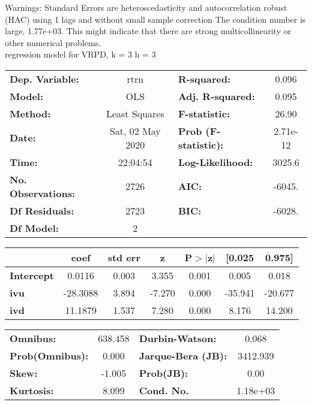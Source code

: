 Warnings: \newline
 [1] Standard Errors are heteroscedasticity and autocorrelation robust (HAC) using 1 lags and without small sample correction \newline
 [2] The condition number is large, 1.77e+03. This might indicate that there are \newline
 strong multicollinearity or other numerical problems.\\ 

regression model for VRPD, k = 3 h = 3\begin{center}
\begin{tabular}{lclc}
\toprule
\textbf{Dep. Variable:}    &       rtrn       & \textbf{  R-squared:         } &     0.096   \\
\textbf{Model:}            &       OLS        & \textbf{  Adj. R-squared:    } &     0.095   \\
\textbf{Method:}           &  Least Squares   & \textbf{  F-statistic:       } &     26.90   \\
\textbf{Date:}             & Sat, 02 May 2020 & \textbf{  Prob (F-statistic):} &  2.71e-12   \\
\textbf{Time:}             &     22:04:54     & \textbf{  Log-Likelihood:    } &    3025.6   \\
\textbf{No. Observations:} &        2726      & \textbf{  AIC:               } &    -6045.   \\
\textbf{Df Residuals:}     &        2723      & \textbf{  BIC:               } &    -6028.   \\
\textbf{Df Model:}         &           2      & \textbf{                     } &             \\
\bottomrule
\end{tabular}
\begin{tabular}{lcccccc}
                   & \textbf{coef} & \textbf{std err} & \textbf{z} & \textbf{P$> |$z$|$} & \textbf{[0.025} & \textbf{0.975]}  \\
\midrule
\textbf{Intercept} &       0.0116  &        0.003     &     3.355  &         0.001        &        0.005    &        0.018     \\
\textbf{ivu}       &     -28.3088  &        3.894     &    -7.270  &         0.000        &      -35.941    &      -20.677     \\
\textbf{ivd}       &      11.1879  &        1.537     &     7.280  &         0.000        &        8.176    &       14.200     \\
\bottomrule
\end{tabular}
\begin{tabular}{lclc}
\textbf{Omnibus:}       & 638.458 & \textbf{  Durbin-Watson:     } &    0.068  \\
\textbf{Prob(Omnibus):} &   0.000 & \textbf{  Jarque-Bera (JB):  } & 3412.939  \\
\textbf{Skew:}          &  -1.005 & \textbf{  Prob(JB):          } &     0.00  \\
\textbf{Kurtosis:}      &   8.099 & \textbf{  Cond. No.          } & 1.18e+03  \\
\bottomrule
\end{tabular}
\end{center}

